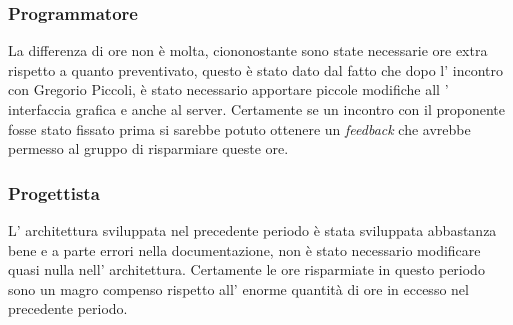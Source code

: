 \subsubsection{Programmatore}
La differenza di ore non è molta, ciononostante sono state necessarie ore extra rispetto a quanto preventivato, questo è stato dato dal fatto che dopo l' incontro con Gregorio Piccoli, è stato necessario apportare piccole modifiche all ' interfaccia grafica e anche al server. Certamente se un incontro con il proponente fosse stato fissato prima si sarebbe potuto ottenere un \textit{feedback} che avrebbe permesso al gruppo di risparmiare queste ore.
\subsubsection{Progettista}
L' architettura sviluppata nel precedente periodo è stata sviluppata abbastanza bene e a parte errori nella documentazione, non è stato necessario modificare quasi nulla nell' architettura. Certamente le ore risparmiate in questo periodo sono un magro compenso rispetto all' enorme quantità di ore in eccesso nel precedente periodo.
